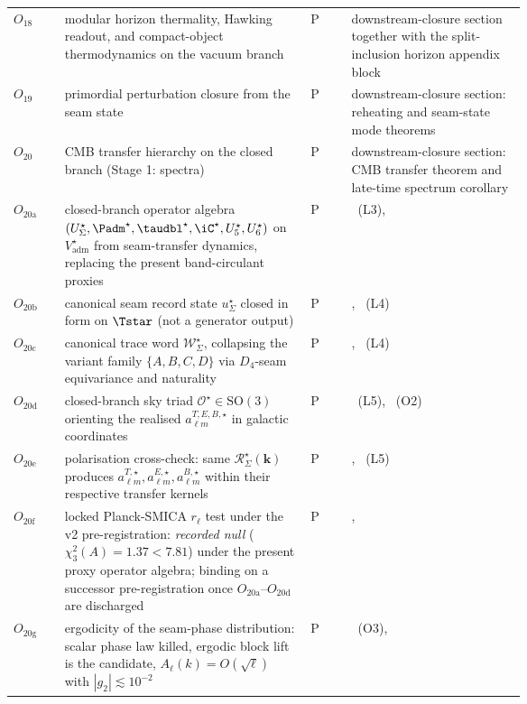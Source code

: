 \begin{table}[p]
\begin{tabularx}{\linewidth}{@{}>{\raggedright\arraybackslash}p{0.10\linewidth}>{\raggedright\arraybackslash}p{0.48\linewidth}>{\centering\arraybackslash}p{0.08\linewidth}Y@{}}
$O_{18}$ & modular horizon thermality, Hawking readout, and compact-object thermodynamics on the vacuum branch & P & downstream-closure section together with the split-inclusion horizon appendix block \\
$O_{19}$ & primordial perturbation closure from the seam state & P & downstream-closure section: reheating and seam-state mode theorems \\
$O_{20}$ & CMB transfer hierarchy on the closed branch (Stage 1: spectra) & P & downstream-closure section: CMB transfer theorem and late-time spectrum corollary \\
$O_{20\mathrm{a}}$ & closed-branch operator algebra $(U_\Sigma^\star,\Padm^\star,\taudbl^\star,\iC^\star,U_5^\star,U_6^\star)$ on $V_{\mathrm{adm}}^\star$ from seam-transfer dynamics, replacing the present band-circulant proxies & P & ~(L3),  \\
$O_{20\mathrm{b}}$ & canonical seam record state $u_\Sigma^\star$ closed in form on $\Tstar$ (not a generator output) & P & , ~(L4) \\
$O_{20\mathrm{c}}$ & canonical trace word $\mathcal W_\Sigma^\star$, collapsing the variant family $\{A,B,C,D\}$ via $D_4$-seam equivariance and naturality & P & , ~(L4) \\
$O_{20\mathrm{d}}$ & closed-branch sky triad $\mathcal O^\star\in\mathrm{SO}(3)$ orienting the realised $a_{\ell m}^{T,E,B,\star}$ in galactic coordinates & P & ~(L5), ~(O2) \\
$O_{20\mathrm{e}}$ & polarisation cross-check: same $\mathcal R_\Sigma^\star(\mathbf k)$ produces $a_{\ell m}^{T,\star},a_{\ell m}^{E,\star},a_{\ell m}^{B,\star}$ within their respective transfer kernels & P & , ~(L5) \\
$O_{20\mathrm{f}}$ & locked Planck-SMICA $r_\ell$ test under the v2 pre-registration: \emph{recorded null} ($\chi_3^2(A)=1.37<7.81$) under the present proxy operator algebra; binding on a successor pre-registration once $O_{20\mathrm{a}}$--$O_{20\mathrm{d}}$ are discharged & P & ,  \\
$O_{20\mathrm{g}}$ & ergodicity of the seam-phase distribution: scalar phase law killed, ergodic block lift is the candidate, $A_\ell(k)=O(\sqrt{\ell})$ with $|g_2|\lesssim 10^{-2}$ & P & ~(O3),  \\

\end{tabularx}
\end{table}
